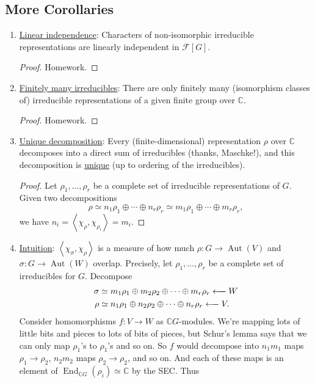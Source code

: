 \documentclass[12pt]{article}
\newcommand{\cx}{\mathbb{C}}
\newcommand{\vbrack}[1]{\left \langle #1 \right \rangle}
\theoremstyle{definition}
\DeclareMathOperator\Aut{Aut}
\DeclareMathOperator\End{End}
\begin{document}
\subsection{More Corollaries}
\begin{enumerate}
    \item \underline{Linear independence}: Characters of non-isomorphic irreducible representations are linearly independent in $\mathcal{F}[G]$.
    \begin{proof}
        Homework.
    \end{proof}
    \item \underline{Finitely many irreducibles}: There are only finitely many (isomorphism classes of) irreducible representations of a given finite group over $\cx$.
    \begin{proof}
        Homework.
    \end{proof}
    \item \underline{Unique decomposition}: Every (finite-dimensional) representation $\rho$ over $\cx$ decomposes into a direct sum of irreducibles (thanks, Maschke!), and this decomposition is \underline{unique} (up to ordering of the irreducibles).
    \begin{proof}
        Let $\rho_1 , \dotsc , \rho_r$ be a complete set of irreducible representations of $G$. Given two decompositions 
        \begin{equation}
            \rho \simeq n_1 \rho_1 \oplus \dotsb \oplus n_r \rho_r \simeq m_1 \rho_1 \oplus \dotsb \oplus m_r \rho_r,
        \end{equation}
        we have $n_i = \vbrack{\chi_{\rho} , \chi_{\rho_i}} = m_i$.
    \end{proof}
    \item \underline{Intuition}: $\vbrack{\chi_{\sigma}, \chi_{\rho}}$ is a measure of how much $\rho : G \to \Aut(V)$ and $\sigma : G \to \Aut(W)$ overlap. Precisely, let $\rho_1 , \dotsc , \rho_r$ be a complete set of irreducibles for $G$. Decompose 
    \begin{equation}
        \begin{split}
            \sigma & \simeq m_1 \rho_1 \oplus m_2 \rho_2 \oplus \dotsb \oplus m_r \rho_r \xlongleftarrow{} W \\
            \rho & \simeq n_1 \rho_1 \oplus n_2 \rho_2 \oplus \dotsb \oplus n_r \rho_r \xlongleftarrow{} V.
        \end{split}
    \end{equation}
    Consider homomorphisms $f : V \to W$ as $\cx G$-modules. We're mapping lots of little bits and pieces to lots of bits of pieces, but Schur's lemma says that we can only map $\rho_1$'s to $\rho_1$'s and so on. So $f$ would decompose into $n_1 m_1$ maps $\rho_1 \to \rho_2$, $n_2 m_2$ maps $\rho_2 \to \rho_2$, and so on. And each of these maps is an element of $\End_{\cx G}(\rho_i) \simeq \cx$ by the SEC. Thus 

\end{enumerate}
\end{document}
